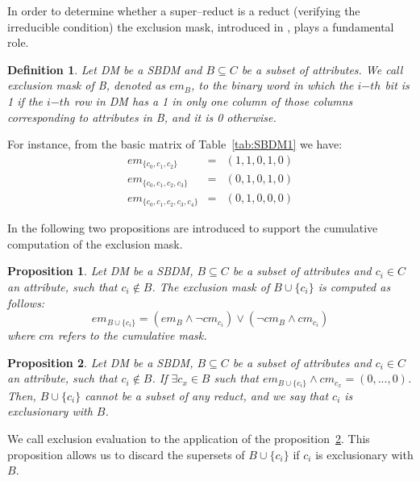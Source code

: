 \documentclass[authoryear,preprint,review,12pt]{elsarticle}
\newtheorem{proposition}{Proposition}
\newtheorem{definition}{Definition}
\begin{document}
	In order to determine whether a super--reduct is a reduct (verifying the irreducible condition) the
	exclusion mask, introduced in \cite{Lias09}, plays a fundamental role. 
	
	\begin{definition}\label{def:exclusion}
		Let DM be a SBDM and $B \subseteq C$ be a subset of attributes. We call exclusion mask of B, denoted as $em_B$, to the binary word in which the $i{\mathit{-th}}$ bit is 1 if the $i{\mathit{-th}}$ row in DM has a 1 in only one column of those columns corresponding to attributes in B, and it is 0 otherwise.
	\end{definition}
	
	For instance, from the basic matrix of Table~\ref{tab:SBDM1} we have:
	$$\begin{array}{lcc}
	  em_{\lbrace c_0,c_1,c_2\rbrace}         &=& (1,1,0,1,0)\\
	  em_{\lbrace c_0,c_1,c_2,c_3\rbrace}     &=& (0,1,0,1,0)\\
	  em_{\lbrace c_0,c_1,c_2,c_3,c_4\rbrace} &=& (0,1,0,0,0)
	\end{array}$$
	
	In \cite{Lias13} the following two propositions are introduced to support the cumulative computation of the exclusion mask.
	
	\begin{proposition}\label{prop:cumul} 
		Let DM be a SBDM, $B \subseteq C$ be a subset of attributes and $c_i \in C$ an attribute, such that $c_i \notin B$. The exclusion mask of $B \cup \lbrace c_i\rbrace$ is computed as follows: $$em_{B \cup \lbrace c_i\rbrace}=(em_B \wedge \neg cm_{c_i}) \vee (\neg cm_B \wedge cm_{c_i})$$ where $cm$ refers to the cumulative mask.
	\end{proposition}
	
	
	\begin{proposition}\label{prop:exclude} 
		Let DM be a SBDM, $B \subseteq C$ be a subset of attributes and $c_i \in C$ an attribute, such that $c_i \notin B$. If $\exists c_x \in B$ such that $em_{B \cup \lbrace c_i\rbrace} \wedge cm_{c_x}=(0,...,0)$. Then, $B \cup \lbrace c_i\rbrace$ cannot be a subset of any reduct, and we say that $c_i$ is exclusionary with $B$.
	\end{proposition}
	
	We call exclusion evaluation to the application of the proposition~\ref{prop:exclude}. This proposition allows us to discard the supersets of $B \cup \lbrace c_i\rbrace$ if $c_i$ is exclusionary with $B$.
	
\end{document}

